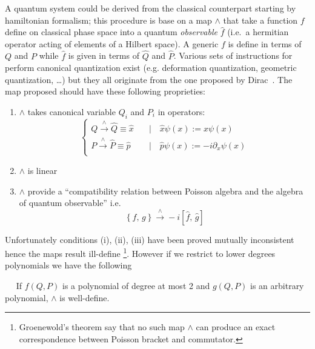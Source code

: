 A quantum system could be derived from the classical counterpart starting by
hamiltonian formalism; this procedure is base on a map $\wedge$ that take a
function $f$ define on classical phase space into a quantum \emph{observable}
$\hat{f}$ (i.e.\ a hermitian operator acting of elements of a Hilbert space). A
generic $f$ is define in terms of $Q$ and $P$ while $\hat{f}$ is given in terms
of $\hat{Q}$ and $ \hat{P}$.
Various sets of instructions for perform canonical quantization exist (e.g.
deformation quantization, geometric quantization, \dots) but they all originate
from the one proposed by Dirac~\cite{Dirac25}. The map proposed should have
these following proprieties:
\begin{enumerate}[label = (\roman*)]
  \item $\wedge$ takes canonical variable $Q_i$ and $P_i$ in operators:
    \begin{equation*}
      \begin{cases}
        Q \xrightarrow{\wedge} \hat{Q} \equiv \hat{x}
        \quad &\mid \quad \hat{x} \psi(x) := x \psi(x) \\
        P \xrightarrow{\wedge} \hat{P} \equiv \hat{p}
        \quad &\mid \quad \hat{p} \psi(x) := -i \partial_x \psi(x) \\
      \end{cases}
    \end{equation*}
  \item $\wedge$ is linear
  \item $\wedge$ provide a ``compatibility relation between Poisson algebra and
    the algebra of quantum observable'' i.e.
    \begin{equation*}
      \left\{ f, \, g \right\} \xrightarrow{\wedge}
      -i \left[ \hat{f}, \, \hat{g} \right]
    \end{equation*}
\end{enumerate}
Unfortunately conditions (i), (ii), (iii) have been proved mutually inconsistent
hence the maps result ill-define
\footnote{
  Groenewold's theorem say that no such map $\wedge$ can produce an exact
  correspondence between Poisson bracket and commutator.
}.
However if we restrict to lower degrees polynomials we have the following

\begin{theorem}~\label{th:2nd_deegree_poli_canonical_quantization}~\cite{Hall13}
  If $f(Q,P)$ is a polynomial of degree at most 2 and $g(Q,P)$ is
  an arbitrary polynomial, $\wedge$ is well-define.
\end{theorem}

